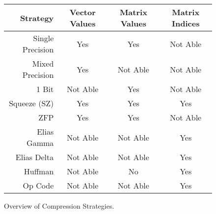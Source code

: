 \begin{figure}
	\centering
	\begin{tabular}{r| c c c}
		Strategy & Vector Values & Matrix Values & Matrix Indices \\
		\hline
		Single Precision & Yes & Yes & Not Able \\
		Mixed Precision & Yes & Not Able & Not Able \\
		1 Bit & Not Able & Yes & Not Able \\
		Squeeze (SZ) & Yes & Yes & Yes \\
		ZFP & Yes & Yes & Not Able \\
		Elias Gamma & Not Able & Not Able & Yes \\
		Elias Delta & Not Able & Not Able & Yes \\
		Huffman & Not Able & No & Yes \\
		Op Code & Not Able & Not Able & Yes
	\end{tabular}
	
	\caption{Overview of Compression Strategies.}
	\label{fig:comp-overview}
\end{figure}